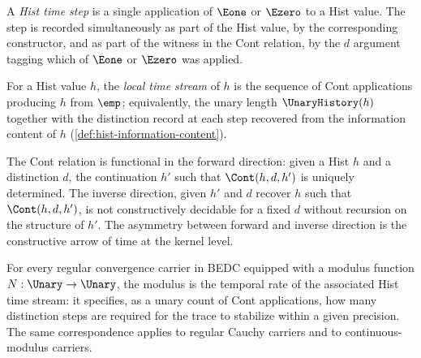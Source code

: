 \begin{definition}
\label{def:hist-time-step}
A \emph{Hist time step} is a single application of \(\Eone\) or \(\Ezero\) to a Hist value. The step is recorded simultaneously as part of the Hist value, by the corresponding constructor, and as part of the witness in the Cont relation, by the \(d\) argument tagging which of \(\Eone\) or \(\Ezero\) was applied.
\end{definition}
\begin{definition}
\label{def:hist-local-time-stream}
For a Hist value \(h\), the \emph{local time stream} of \(h\) is the sequence of Cont applications producing \(h\) from \(\emp\); equivalently, the unary length \(\UnaryHistory(h)\) together with the distinction record at each step recovered from the information content of \(h\) (\autoref{def:hist-information-content}).
\end{definition}
\begin{theorem}
\label{thm:cont-time-asymmetric}
The Cont relation is functional in the forward direction: given a Hist \(h\) and a distinction \(d\), the continuation \(h'\) such that \(\Cont(h, d, h')\) is uniquely determined. The inverse direction, given \(h'\) and \(d\) recover \(h\) such that \(\Cont(h, d, h')\), is not constructively decidable for a fixed \(d\) without recursion on the structure of \(h'\). The asymmetry between forward and inverse direction is the constructive arrow of time at the kernel level.
\end{theorem}
\begin{theorem}
\label{thm:modulus-temporal-rate}
For every regular convergence carrier in BEDC equipped with a modulus function \(N : \Unary \to \Unary\), the modulus is the temporal rate of the associated Hist time stream: it specifies, as a unary count of Cont applications, how many distinction steps are required for the trace to stabilize within a given precision. The same correspondence applies to regular Cauchy carriers and to continuous-modulus carriers.
\end{theorem}
